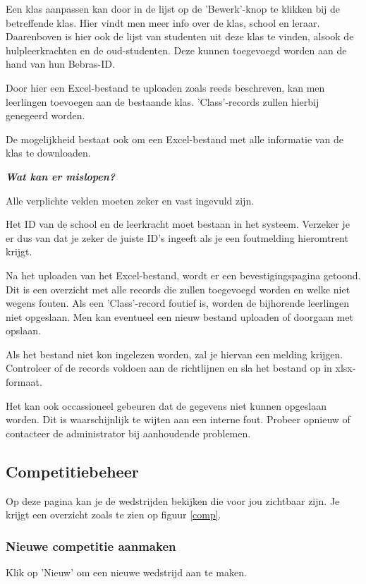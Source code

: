 \documentclass[]{article}
\begin{document}
Een klas aanpassen kan door in de lijst op de 'Bewerk'-knop te klikken bij de betreffende klas. Hier vindt men meer info over de klas, school en leraar. Daarenboven is hier ook de lijst van studenten uit deze klas te vinden, alsook de hulpleerkrachten en de oud-studenten. Deze kunnen toegevoegd worden aan de hand van hun Bebras-ID.

Door hier een Excel-bestand te uploaden zoals reeds beschreven, kan men leerlingen toevoegen aan de bestaande klas. 'Class'-records zullen hierbij genegeerd worden.

De mogelijkheid bestaat ook om een Excel-bestand met alle informatie van de klas te downloaden.

\textbf{\textit{Wat kan er mislopen?}}

Alle verplichte velden moeten zeker en vast ingevuld zijn.

Het ID van de school en de leerkracht moet bestaan in het systeem. Verzeker je er dus van dat je zeker de juiste ID's ingeeft als je een foutmelding hieromtrent krijgt.

Na het uploaden van het Excel-bestand, wordt er een bevestigingspagina getoond. Dit is een overzicht met alle records die zullen toegevoegd worden en welke niet wegens fouten. Als een 'Class'-record foutief is, worden de bijhorende leerlingen niet opgeslaan. Men kan eventueel een nieuw bestand uploaden of doorgaan met opslaan.

Als het bestand niet kon ingelezen worden, zal je hiervan een melding krijgen. Controleer of de records voldoen aan de richtlijnen en sla het bestand op in xlsx-formaat.

Het kan ook occassioneel gebeuren dat de gegevens niet kunnen opgeslaan worden. Dit is waarschijnlijk te wijten aan een interne fout. Probeer opnieuw of contacteer de administrator bij aanhoudende problemen. 

\subsection{Competitiebeheer}
Op deze pagina kan je de wedstrijden bekijken die voor jou zichtbaar zijn. Je krijgt een overzicht zoals te zien op figuur \ref{comp}. 

\subsubsection{Nieuwe competitie aanmaken}

Klik op 'Nieuw' om een nieuwe wedstrijd aan te maken.
\end{document}
